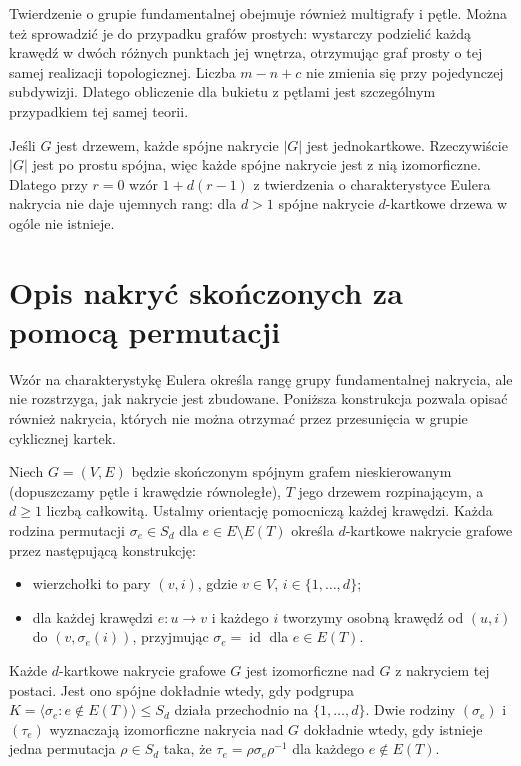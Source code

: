 \begin{uwaga}
Twierdzenie o grupie fundamentalnej obejmuje również
multigrafy i pętle. Można też sprowadzić je do przypadku
grafów prostych: wystarczy podzielić każdą krawędź w dwóch
różnych punktach jej wnętrza, otrzymując graf prosty
o tej samej realizacji topologicznej. Liczba $m-n+c$ nie zmienia się przy pojedynczej
subdywizji. Dlatego obliczenie dla bukietu z pętlami
jest szczególnym przypadkiem tej samej teorii.
\end{uwaga}

\begin{uwaga}
Jeśli $G$ jest drzewem, każde spójne nakrycie $|G|$
jest jednokartkowe. Rzeczywiście $|G|$ jest
po prostu spójna, więc każde spójne nakrycie
jest z nią izomorficzne. Dlatego przy $r=0$
wzór $1+d(r-1)$ z twierdzenia o charakterystyce Eulera nakrycia
nie daje ujemnych rang: dla $d>1$ spójne
nakrycie $d$-kartkowe drzewa w ogóle nie istnieje.
\end{uwaga}

\section{Opis nakryć skończonych za pomocą permutacji}
\label{sec:tg-permutation-covers}

Wzór na charakterystykę Eulera określa rangę grupy
fundamentalnej nakrycia, ale nie rozstrzyga, jak nakrycie
jest zbudowane. Poniższa konstrukcja pozwala opisać
również nakrycia, których nie można otrzymać przez
przesunięcia w grupie cyklicznej kartek.

\begin{twierdzenie}
\label{thm:tg-permutation-covers}
Niech $G=(V,E)$ będzie skończonym spójnym grafem
nieskierowanym (dopuszczamy pętle i krawędzie równoległe),
$T$ jego drzewem rozpinającym, a $d\geq1$ liczbą całkowitą.
Ustalmy orientację pomocniczą każdej krawędzi.
Każda rodzina permutacji $\sigma_e\in S_d$
dla $e\in E\setminus E(T)$ określa $d$-kartkowe
nakrycie grafowe przez następującą konstrukcję:
\begin{itemize}
\item wierzchołki to pary $(v,i)$, gdzie $v\in V$,
$i\in\{1,\ldots,d\}$;
\item dla każdej krawędzi $e:u\to v$ i każdego $i$
tworzymy osobną krawędź od $(u,i)$ do $(v,\sigma_e(i))$,
przyjmując $\sigma_e=\operatorname{id}$ dla $e\in E(T)$.
\end{itemize}
Każde $d$-kartkowe nakrycie grafowe $G$ jest
izomorficzne nad $G$ z nakryciem tej postaci.
Jest ono spójne dokładnie wtedy, gdy podgrupa
$K=\langle \sigma_e:e\notin E(T)\rangle\leq S_d$
działa przechodnio na $\{1,\ldots,d\}$.
Dwie rodziny $(\sigma_e)$ i $(\tau_e)$ wyznaczają
izomorficzne nakrycia nad $G$ dokładnie wtedy,
gdy istnieje jedna permutacja $\rho\in S_d$
taka, że $\tau_e=\rho\sigma_e\rho^{-1}$ dla każdego
$e\notin E(T)$.
\end{twierdzenie}

